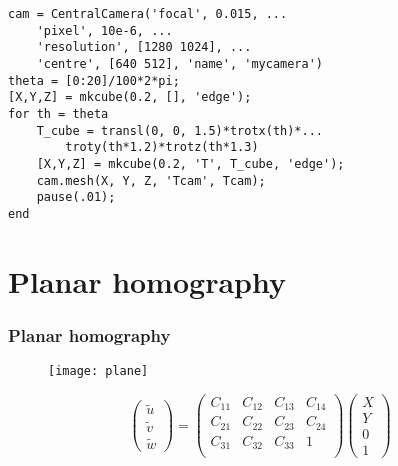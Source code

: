 \begin{frame}[fragile]
\begin{lstlisting}
cam = CentralCamera('focal', 0.015, ...
    'pixel', 10e-6, ... 
    'resolution', [1280 1024], ...
    'centre', [640 512], 'name', 'mycamera')
theta = [0:20]/100*2*pi;
[X,Y,Z] = mkcube(0.2, [], 'edge');
for th = theta
    T_cube = transl(0, 0, 1.5)*trotx(th)*...
    	troty(th*1.2)*trotz(th*1.3)
    [X,Y,Z] = mkcube(0.2, 'T', T_cube, 'edge');
    cam.mesh(X, Y, Z, 'Tcam', Tcam);
    pause(.01);
end
\end{lstlisting}
\end{frame}

\section{Planar homography}

\begin{frame}
\frametitle{Planar homography}
\begin{figure}[!h]
\centering
\texttt{[image: plane]}
\end{figure}
\[
\left (
\begin{array}{c}
\tilde{u} \\
\tilde{v} \\
\tilde{w}
\end{array}
\right )
=
\left (
\begin{array}{cccc}
C_{11} & C_{12} & C_{13} & C_{14} \\
C_{21} & C_{22} & C_{23} & C_{24} \\
C_{31} & C_{32} & C_{33} & 1 \\
\end{array}
\right )
\left (
\begin{array}{c}
X \\
Y \\
0 \\
1
\end{array}
\right )
\]
\end{frame}

